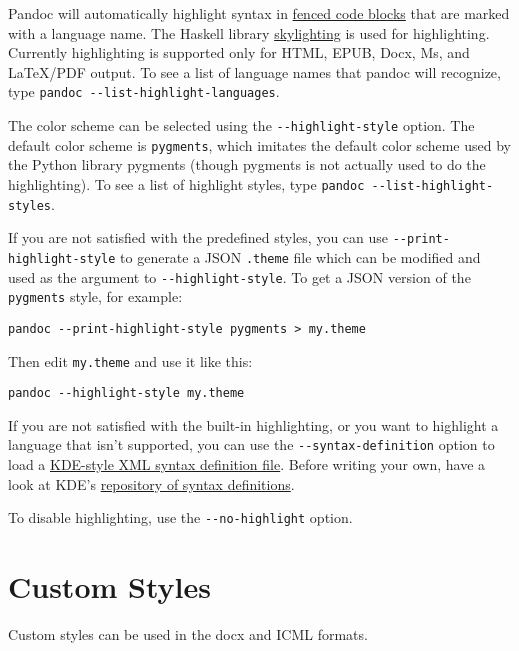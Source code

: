 \documentclass[
  a4paper,
]{article}
\begin{document}
Pandoc will automatically highlight syntax in
\protect\hyperlink{fenced-code-blocks}{fenced code blocks} that are
marked with a language name. The Haskell library
\href{https://github.com/jgm/skylighting}{skylighting} is used for
highlighting. Currently highlighting is supported only for HTML, EPUB,
Docx, Ms, and LaTeX/PDF output. To see a list of language names that
pandoc will recognize, type
\texttt{pandoc\ -\/-list-highlight-languages}.

The color scheme can be selected using the \texttt{-\/-highlight-style}
option. The default color scheme is \texttt{pygments}, which imitates
the default color scheme used by the Python library pygments (though
pygments is not actually used to do the highlighting). To see a list of
highlight styles, type \texttt{pandoc\ -\/-list-highlight-styles}.

If you are not satisfied with the predefined styles, you can use
\texttt{-\/-print-highlight-style} to generate a JSON \texttt{.theme}
file which can be modified and used as the argument to
\texttt{-\/-highlight-style}. To get a JSON version of the
\texttt{pygments} style, for example:

\begin{verbatim}
pandoc --print-highlight-style pygments > my.theme
\end{verbatim}

Then edit \texttt{my.theme} and use it like this:

\begin{verbatim}
pandoc --highlight-style my.theme
\end{verbatim}

If you are not satisfied with the built-in highlighting, or you want to
highlight a language that isn't supported, you can use the
\texttt{-\/-syntax-definition} option to load a
\href{https://docs.kde.org/stable5/en/kate/katepart/highlight.html}{KDE-style
XML syntax definition file}. Before writing your own, have a look at
KDE's
\href{https://github.com/KDE/syntax-highlighting/tree/master/data/syntax}{repository
of syntax definitions}.

To disable highlighting, use the \texttt{-\/-no-highlight} option.

\hypertarget{custom-styles}{%
\section{Custom Styles}\label{custom-styles}}

Custom styles can be used in the docx and ICML formats.
\end{document}
